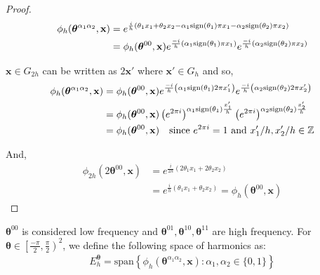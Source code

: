 \documentclass[12pt]{article}
\begin{document}
\begin{proof}
\begin{align*}
     \phi_h(\boldsymbol{\theta}^{\alpha_1\alpha_2}, \mathbf{x}) &= e^{\frac{i}{h}\left(\theta_1x_1 + \theta_2x_2 - \alpha_1 \text{sign} (\theta_1)\pi x_1 - \alpha_2 \text{sign} (\theta_2)\pi x_2\right)} \\
     &= \phi_h(\boldsymbol{\theta}^{00}, \mathbf{x})e^{\frac{-i}{h}\left(\alpha_1 \text{sign} (\theta_1)\pi x_1\right)}e^{\frac{-i}{h}\left( \alpha_2 \text{sign} (\theta_2)\pi x_2\right)}
\end{align*}

$\mathbf{x} \in G_{2h}$ can be written as $2\mathbf{x}'$ where $\mathbf{x}' \in G_h$ and so,
\begin{align*}
     \phi_h(\boldsymbol{\theta}^{\alpha_1\alpha_2}, \mathbf{x}) &= \phi_h(\boldsymbol{\theta}^{00}, \mathbf{x})e^{\frac{-i}{h}\left(\alpha_1 \text{sign} (\theta_1)2\pi x_1'\right)}e^{\frac{-i}{h}\left( \alpha_2 \text{sign} (\theta_2)2\pi x_2'\right)} \\
     &= \phi_h(\boldsymbol{\theta}^{00}, \mathbf{x})\left(e^{2\pi i}\right)^{\alpha_1 \text{sign} (\theta_1)\frac{x_1'}{h}}\left(e^{2\pi i}\right)^{\alpha_2 \text{sign} (\theta_2)\frac{x_2'}{h}} \\
     &=  \phi_h(\boldsymbol{\theta}^{00}, \mathbf{x}) \quad \text{since $e^{2\pi i} = 1$ and $x_1'/h, x_2'/h \in \mathbb{Z}$}
\end{align*}

And,
\begin{align*}
    \phi_{2h}(2\boldsymbol{\theta}^{00}, \mathbf{x}) &= e^{\frac{i}{2h}\left(2\theta_1x_1 + 2\theta_2x_2\right)} \\
    &= e^{\frac{i}{h}\left(\theta_1x_1 + \theta_2x_2\right)} = \phi_h(\boldsymbol{\theta}^{00}, \mathbf{x}) 
\end{align*}
   
\end{proof}




$\boldsymbol{\theta}^{00}$ is considered low frequency and $\boldsymbol{\theta}^{01}, \boldsymbol{\theta}^{10}, \boldsymbol{\theta}^{11}$ are high frequency. For $\boldsymbol{\theta} \in \left[\frac{-\pi}{2}, \frac{\pi}{2}\right)^2$, we define the following space of harmonics as:
\begin{align*}
    E^{\boldsymbol{\theta}}_h = \text{span} \left\{\phi_h(\boldsymbol{\theta}^{\alpha_1\alpha_2}, \mathbf{x}): \alpha_1 , \alpha_2 \in \{0, 1\}\right\}
\end{align*}
\end{document}
